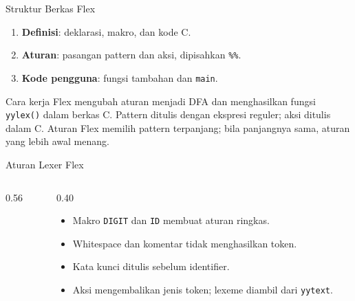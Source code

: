 \documentclass[aspectratio=169,10pt,t]{beamer}
\begin{document}
\begin{frame}{Struktur Berkas Flex}
  \begin{enumerate}
    \setlength{\itemsep}{3pt}
    \item \textbf{Definisi}: deklarasi, makro, dan kode C.
    \item \textbf{Aturan}: pasangan pattern dan aksi, dipisahkan
          \texttt{\%\%}.
    \item \textbf{Kode pengguna}: fungsi tambahan dan \texttt{main}.
  \end{enumerate}

  \vspace{4pt}
  \begin{block}{Cara kerja}
    \footnotesize
    Flex mengubah aturan menjadi DFA dan menghasilkan fungsi
    \texttt{yylex()} dalam berkas C. Pattern ditulis dengan ekspresi
    reguler; aksi ditulis dalam C. Aturan Flex memilih pattern
    terpanjang; bila panjangnya sama, aturan yang lebih awal menang.
  \end{block}
\end{frame}

\begin{frame}[fragile]{Aturan Lexer Flex}
  \begin{columns}[T,onlytextwidth]
    \begin{column}{0.56\textwidth}
      
    \end{column}
    \begin{column}{0.40\textwidth}
      \begin{itemize}
        \item Makro \texttt{DIGIT} dan \texttt{ID} membuat aturan
              ringkas.
        \item Whitespace dan komentar tidak menghasilkan token.
        \item Kata kunci ditulis sebelum identifier.
        \item Aksi mengembalikan jenis token; lexeme diambil dari
              \texttt{yytext}.
      \end{itemize}
    \end{column}
  \end{columns}
\end{frame}
\end{document}
